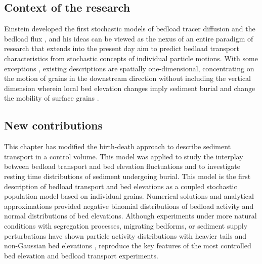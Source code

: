 \subsection{Context of the research}
Einstein developed the first stochastic models of bedload tracer diffusion \citep{Einstein1937} and the bedload flux \citep{Einstein1950}, and his ideas can be viewed as the nexus of an entire paradigm of research that extends into the present day \DIFdelbegin {}\DIFdelend \DIFaddbegin {}\DIFaddend aim to predict bedload transport characteristics from stochastic concepts of individual particle motions.
With some exceptions \citep{Yang1971,Nakagawa1980,Pelosi2016,Wu2019,Wu2019a}, existing descriptions are spatially one-dimensional, concentrating on the motion of grains in the downstream direction without including the vertical dimension wherein local bed elevation changes imply sediment burial \citep{Voepel2013,Martin2014} and change the mobility of surface grains \citep{Yang1971,Nakagawa1980}.

\subsection{New contributions}

This chapter has modified the birth-death approach to describe sediment transport in a control volume. This model was applied to study the interplay between bedload transport and bed elevation fluctuations and to investigate resting time distributions of sediment undergoing burial.
This model is the first description of bedload transport and bed elevations as a coupled stochastic population model based on individual grains.
Numerical solutions and analytical approximations provided negative binomial distributions of bedload activity and normal distributions of bed elevations.
Although experiments under more natural conditions with segregation processes,  migrating bedforms, or sediment supply perturbations have shown particle activity distributions with heavier tails \citep{Dhont2018,Saletti2015} and non-Gaussian bed elevations \citep{Singh2012,Aberle2006}, \DIFdelbegin {}\DIFdelend \DIFaddbegin {}\DIFaddend reproduce the key features of the most controlled bed elevation \citep{Wong2007,Martin2014} and bedload transport \citep{Heyman2016,Ancey2008} experiments\DIFdelbegin {}\DIFdelend .

